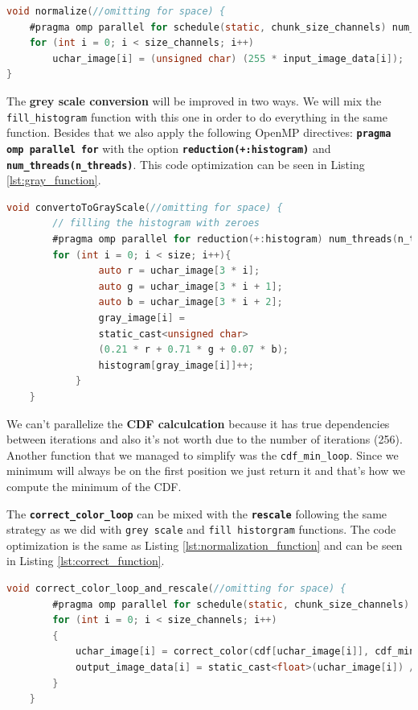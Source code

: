 \documentclass[sigconf]{acmart}
\begin{document}
\begin{lstlisting}[language=C, caption=Normalization Function, label={lst:normalization_function}]
void normalize(//omitting for space) {
    #pragma omp parallel for schedule(static, chunk_size_channels) num_threads(n_threads)
    for (int i = 0; i < size_channels; i++)
        uchar_image[i] = (unsigned char) (255 * input_image_data[i]);
}
\end{lstlisting}
The \textbf{grey scale conversion} will be improved in two ways. We will mix the \texttt{fill\_histogram}
function with this one in order to do everything in the same function. Besides that we also apply the following OpenMP directives: \texttt{\textbf{pragma omp parallel for}}
with the option \texttt{\textbf{reduction(+:histogram)}} and \texttt{\textbf{num\_threads(n\_threads)}}. This code optimization can be seen in Listing \ref{lst:gray_function}.
\begin{lstlisting}[language=C, caption=Grey Conversion Function, label={lst:gray_function}]
	void convertoToGrayScale(//omitting for space) {
       	// filling the histogram with zeroes
        #pragma omp parallel for reduction(+:histogram) num_threads(n_threads)
        for (int i = 0; i < size; i++){
                auto r = uchar_image[3 * i];
                auto g = uchar_image[3 * i + 1];
                auto b = uchar_image[3 * i + 2];
                gray_image[i] = 
                static_cast<unsigned char>
                (0.21 * r + 0.71 * g + 0.07 * b);
                histogram[gray_image[i]]++;
            }
    }
\end{lstlisting}
We can't parallelize the \textbf{CDF calculcation} because it has true dependencies between iterations and also it's not worth due to the number of iterations (256).
Another function that we managed to simplify was the \texttt{cdf\_min\_loop}. Since we minimum will always be on the first position we just return it and that's how we compute
the minimum of the CDF.

The \texttt{\textbf{correct\_color\_loop}} can be mixed with the \texttt{\textbf{rescale}} following the same strategy as we did with \texttt{grey scale} and \texttt{fill historgram} functions. The code optimization is the same as Listing \ref{lst:normalization_function} and can be seen in Listing \ref{lst:correct_function}.
\begin{lstlisting}[language=C, caption=Color Correction Function, label={lst:correct_function}]
	void correct_color_loop_and_rescale(//omitting for space) {
        #pragma omp parallel for schedule(static, chunk_size_channels) num_threads(n_threads)
        for (int i = 0; i < size_channels; i++)
        {
            uchar_image[i] = correct_color(cdf[uchar_image[i]], cdf_min);
            output_image_data[i] = static_cast<float>(uchar_image[i]) / 255.0f;
        }
    }
\end{lstlisting}
\end{document}
